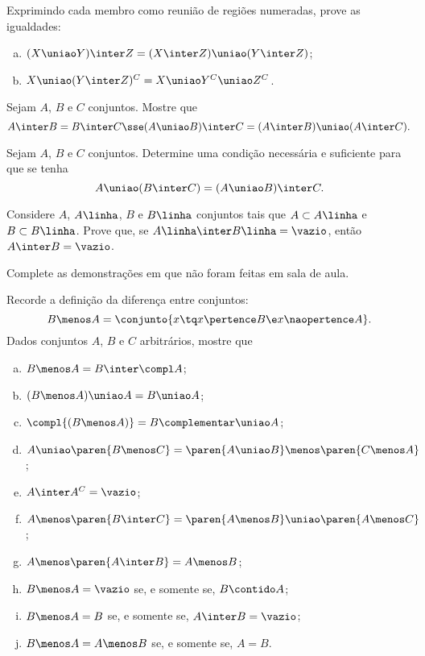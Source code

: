 \begin{exercise}
  Exprimindo cada membro como reunião de regiões numeradas, prove as igualdades:
  \begin{enumerate}[a)]
    \item $(X \uniao Y) \inter Z = (X \inter Z) \uniao (Y \inter Z)$;
    \item $X \uniao (Y \inter Z )^C = X \uniao Y^C \uniao Z^C$.
  \end{enumerate}
\end{exercise}

\begin{exercise}
  Sejam $A$, $B$ e $C$ conjuntos. Mostre que 
  $$A \inter B = B \inter C \sse (A \uniao B) \inter C =(A \inter B) \uniao (A \inter C). $$
\end{exercise}

\begin{exercise}
  Sejam $A$, $B$ e $C$ conjuntos. Determine uma condição necessária e suficiente para que se tenha 
  \[
    A \uniao (B \inter C) = (A \uniao B) \inter C.
  \]
\end{exercise}

\begin{exercise}
  Considere $A$, $A\linha$, $B$ e $B\linha$ conjuntos tais que $A  \subset A\linha$ e 
  $B \subset B\linha$. Prove que, se $A\linha \inter B\linha=\vazio$, então
  $A\inter B = \vazio$.  
\end{exercise}

\begin{exercise}
  Complete as demonstrações em  que não foram feitas em sala de aula.
\end{exercise}

\begin{exercise}
  Recorde a definição da diferença entre conjuntos:
  \[
    B \menos A = \conjunto{ x \tq x \pertence B \e x \naopertence A}.
  \]
  Dados conjuntos $A$, $B$ e $C$ arbitrários, mostre que
  \begin{enumerate}[a)]
    \item $B \menos A = B \inter \compl A$;
    \item $(B \menos A) \uniao A = B \uniao A$;
    \item $\compl{(B \menos A)} = B\complementar \uniao A$;
    \item $A \uniao \paren{ B \menos C } = \paren{A \uniao B } \menos \paren{C \menos A }$;
    \item $A \inter A^C = \vazio$;
    \item $A \menos \paren{B \inter C } = \paren{A \menos B } \uniao \paren{A \menos C }$;
    \item $A \menos \paren{ A \inter B } = A \menos B$;
    \item $B \menos A = \vazio$ se, e somente se, $B \contido A$;
    \item $B \menos A = B$ se, e somente se, $A \inter B = \vazio$;
    \item $B \menos A = A \menos B$ se, e somente se, $A = B$.
  \end{enumerate}
\end{exercise}


